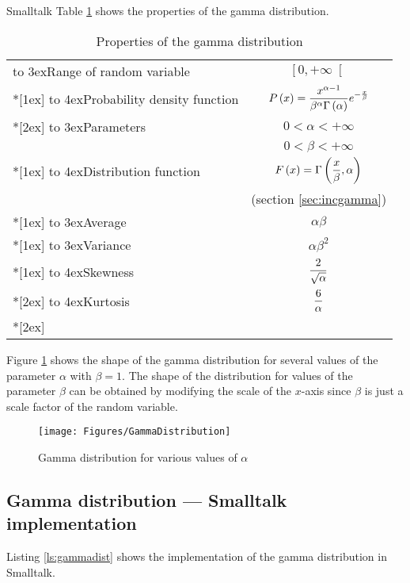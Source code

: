 \begin{displaycode}{Smalltalk}
Table \ref{tb:gammadist} shows the properties of the gamma
distribution.
\begin{table}[h]
  \centering
  \caption{Properties of the gamma distribution}\label{tb:gammadist}
\vspace{1 ex}
\begin{tabular}{|l|c|} \hline
  \vbox to 3ex{}Range of random variable & $\left[0,+\infty\right[ $\\ *[1ex] \hline
  \vbox to 4ex{}Probability density function & $\displaystyle P\left(x\right)=
  {x^{\alpha - 1}\over \beta^{\alpha}\Gamma\left(\alpha\right)}e^{-{x\over\beta}}$ \\*[2ex]  \hline
  \vbox to 3ex{}Parameters & $0<\alpha<+\infty$ \\
  & $0<\beta<+\infty$\\*[1ex]  \hline
  \vbox to 4ex{}Distribution function & $\displaystyle F\left(x\right)=\Gamma\left({x\over\beta},\alpha\right)$ \\
  &(\cf section \ref{sec:incgamma}) \\*[1ex]  \hline
  \vbox to 3ex{}Average & $\alpha\beta$ \\*[1ex] \hline
  \vbox to 3ex{}Variance & $\alpha\beta^2$ \\*[1ex] \hline
  \vbox to 4ex{}Skewness & $\displaystyle{2\over\sqrt{\alpha}}$ \\*[2ex] \hline
  \vbox to 4ex{}Kurtosis & $\displaystyle{6\over\alpha}$ \\*[2ex] \hline
\end{tabular}
\end{table}
Figure \ref{fig:gammaDistr} shows the shape of the gamma
distribution for several values of the parameter $\alpha$ with
$\beta = 1$. The shape of the distribution for values of the
parameter $\beta$ can be obtained by modifying the scale of the
$x$-axis since $\beta$ is just a scale factor of the random
variable.
\begin{figure}
  \centering\texttt{[image: Figures/GammaDistribution]}
  \caption{Gamma distribution for various values of $\alpha$
  }\label{fig:gammaDistr}
\end{figure}

\subsection{Gamma distribution --- Smalltalk implementation}
\label{sec:sgammadist}  Listing \ref{ls:gammadist} shows the implementation of
the gamma distribution in Smalltalk.


\end{displaycode}
